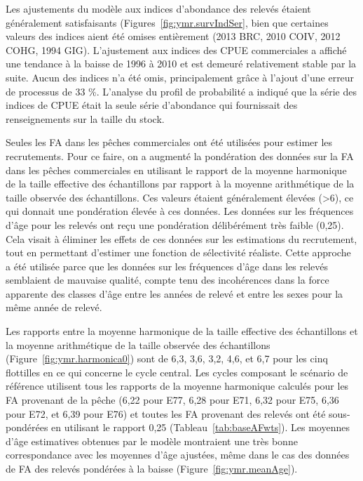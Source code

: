 \documentclass[11pt]{book}
\newcommand{\pc}{\%}
\begin{document}
Les ajustements du mod\`{e}le aux indices d'abondance des relev\'{e}s \'{e}taient g\'{e}n\'{e}ralement satisfaisants (Figures~\ref{fig:ymr.survIndSer}, bien que certaines valeurs des indices aient \'{e}t\'{e} omises enti\`{e}rement (2013 BRC, 2010 COIV, 2012 COHG, 1994 GIG).
L'ajustement aux indices des CPUE commerciales a affich\'{e} une tendance \`{a} la baisse de 1996 \`{a} 2010 et est demeur\'{e} relativement stable par la suite.
Aucun des indices n'a \'{e}t\'{e} omis, principalement gr\^{a}ce \`{a} l'ajout d'une erreur de processus de 33 \pc.
L'analyse du profil de probabilit\'{e} a indiqu\'{e} que la s\'{e}rie des indices de CPUE \'{e}tait la seule s\'{e}rie d'abondance qui fournissait des renseignements sur la taille du stock.

Seules les FA dans les p\^{e}ches commerciales ont \'{e}t\'{e} utilis\'{e}es pour estimer les recrutements. 
Pour ce faire, on a augment\'{e} la pond\'{e}ration des donn\'{e}es sur la FA dans les p\^{e}ches commerciales en utilisant le rapport de la moyenne harmonique de la taille effective des \'{e}chantillons par rapport \`{a} la moyenne arithm\'{e}tique de la taille observ\'{e}e des \'{e}chantillons.
Ces valeurs \'{e}taient g\'{e}n\'{e}ralement \'{e}lev\'{e}es (>6), ce qui donnait une pond\'{e}ration \'{e}lev\'{e}e \`{a} ces donn\'{e}es. Les donn\'{e}es sur les fr\'{e}quences d'\^{a}ge pour les relev\'{e}s ont re\c{c}u une pond\'{e}ration d\'{e}lib\'{e}r\'{e}ment tr\`{e}s faible (0,25).
Cela visait \`{a} \'{e}liminer les effets de ces donn\'{e}es sur les estimations du recrutement, tout en permettant d'estimer une fonction de s\'{e}lectivit\'{e} r\'{e}aliste. Cette approche a \'{e}t\'{e} utilis\'{e}e parce que les donn\'{e}es sur les fr\'{e}quences d'\^{a}ge dans les relev\'{e}s semblaient de mauvaise qualit\'{e}, compte tenu des incoh\'{e}rences dans la force apparente des classes d'\^{a}ge entre les ann\'{e}es de relev\'{e} et entre les sexes pour la m\^{e}me ann\'{e}e de relev\'{e}.

Les rapports entre la moyenne harmonique de la taille effective des \'{e}chantillons et la moyenne arithm\'{e}tique de la taille observ\'{e}e des \'{e}chantillons (Figure~\ref{fig:ymr.harmonica0}) sont de 6,3, 3,6, 3,2, 4,6, et 6,7 pour les cinq flottilles en ce qui concerne le cycle central.
Les cycles composant le sc\'{e}nario de r\'{e}f\'{e}rence utilisent tous les rapports de la moyenne harmonique calcul\'{e}s pour les FA provenant de la p\^{e}che (6,22 pour E77, 6,28 pour E71, 6,32 pour E75, 6,36 pour E72, et 6,39 pour E76) et toutes les FA provenant des relev\'{e}s ont \'{e}t\'{e} sous-pond\'{e}r\'{e}es en utilisant le rapport 0,25 (Tableau~\ref{tab:baseAFwts}).
Les moyennes d'\^{a}ge estimatives obtenues par le mod\`{e}le montraient une tr\`{e}s bonne correspondance avec les moyennes d'\^{a}ge ajust\'{e}es, m\^{e}me dans le cas des donn\'{e}es de FA des relev\'{e}s pond\'{e}r\'{e}es \`{a} la baisse (Figure~\ref{fig:ymr.meanAge}).
\end{document}
